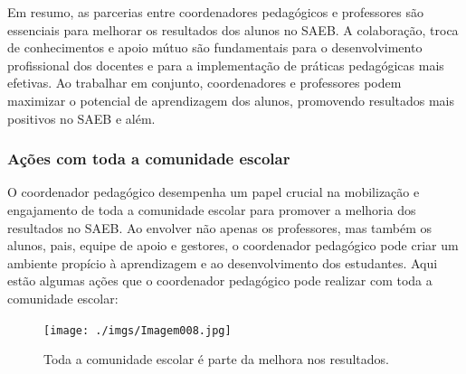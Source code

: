 Em resumo, as parcerias entre coordenadores pedagógicos e professores
são essenciais para melhorar os resultados dos alunos no SAEB. A
colaboração, troca de conhecimentos e apoio mútuo são fundamentais para
o desenvolvimento profissional dos docentes e para a implementação de
práticas pedagógicas mais efetivas. Ao trabalhar em conjunto,
coordenadores e professores podem maximizar o potencial de aprendizagem
dos alunos, promovendo resultados mais positivos no SAEB e além.

\subsubsection{Ações com toda a comunidade
escolar}\label{auxe7uxf5es-com-toda-a-comunidade-escolar}

O coordenador pedagógico desempenha um papel crucial na mobilização e
engajamento de toda a comunidade escolar para promover a melhoria dos
resultados no SAEB. Ao envolver não apenas os professores, mas também os
alunos, pais, equipe de apoio e gestores, o coordenador pedagógico pode
criar um ambiente propício à aprendizagem e ao desenvolvimento dos
estudantes. Aqui estão algumas ações que o coordenador pedagógico pode
realizar com toda a comunidade escolar:

\begin{figure}
\centering
\texttt{[image: ./imgs/Imagem008.jpg]}
\caption{Toda a comunidade escolar é parte da melhora nos resultados.}
\end{figure}

